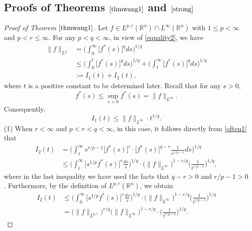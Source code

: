 \documentclass{birkjour}
\theoremstyle{definition}
\theoremstyle{remark}
\numberwithin{equation}{section}
\begin{document}
\subsection{Proofs of Theorems $\ref{thmwang1}$ and $\ref{strong}$}
\begin{proof}[Proof of Theorem $\ref{thmwang1}$]
Let $f\in L^{p,r}(\mathbb R^n)\cap{L^\infty}(\mathbb R^n)$ with $1\leq p<\infty$ and $p<r\leq\infty$. For any $p<q<\infty$, in view of \eqref{equality2}, we have
\begin{equation*}
\begin{split}
\|f\|_{L^q}&=\bigg(\int_0^{\infty}\big[f^{*}(s)\big]^qds\bigg)^{1/q}\\
&\leq\bigg(\int_0^{t}\big[f^{*}(s)\big]^qds\bigg)^{1/q}+\bigg(\int_{t}^{\infty}\big[f^{*}(s)\big]^qds\bigg)^{1/q}\\
&:=I_1(t)+I_2(t),
\end{split}
\end{equation*}
where $t$ is a positive constant to be determined later. Recall that for any $s>0$,
\begin{equation}\label{often1}
f^{*}(s)\leq \sup_{s>0}f^{*}(s)=\|f\|_{L^{\infty}}.
\end{equation}
Consequently,
\begin{equation*}
I_1(t)\leq\|f\|_{L^\infty}\cdot t^{1/q}.
\end{equation*}
(1) When $r<\infty$ and $p<r<q<\infty$, in this case, it follows directly from \eqref{often1} that
\begin{equation*}
\begin{split}
I_2(t)&=\bigg(\int_{t}^{\infty}s^{r/p-1}\big[f^{*}(s)\big]^{r}\cdot\big[f^{*}(s)\big]^{q-r}\frac{1}{s^{r/p-1}}ds\bigg)^{1/q}\\
&\leq\bigg(\int_{t}^{\infty}\Big[s^{1/p}f^{*}(s)\Big]^r\frac{ds}{s}\bigg)^{1/q}
\cdot\big(\|f\|_{L^\infty}\big)^{1-r/q}\Big(\frac{1}{t^{r/p-1}}\Big)^{1/q},
\end{split}
\end{equation*}
where in the last inequality we have used the facts that $q-r>0$ and $r/p-1>0$. Furthermore, by the definition of $L^{p,r}(\mathbb R^n)$, we obtain
\begin{equation*}
\begin{split}
I_2(t)&\leq\bigg(\int_{0}^{\infty}\Big[s^{1/p}f^{*}(s)\Big]^r\frac{ds}{s}\bigg)^{1/q}
\cdot\big(\|f\|_{L^\infty}\big)^{1-r/q}\Big(\frac{1}{t^{r/p-1}}\Big)^{1/q}\\
&=\big(\|f\|_{L^{p,r}}\big)^{r/q}\big(\|f\|_{L^\infty}\big)^{1-r/q}\cdot\Big(\frac{1}{t^{r/p-1}}\Big)^{1/q}.

\end{split}
\end{equation*}
\end{proof}
\end{document}
